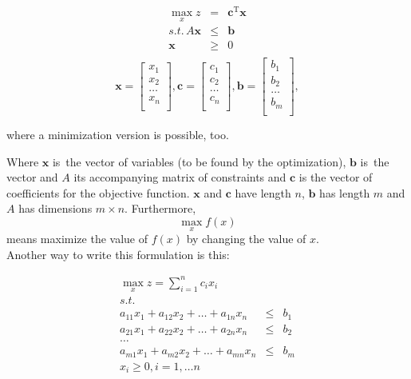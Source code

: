 \begin{eqnarray*}
\max_{x} z & = & \mathbf{c}^{\mathrm{T}}\mathbf{x} \\
s.t.\, A\mathbf{x} & \leqslant & \mathbf{b} \\
\mathbf{x} & \geqslant & 0 \\
\end{eqnarray*}
\[
\mathbf{x} =
\begin{bmatrix}
x_1 \\
x_2 \\
\ldots \\
x_n \\
\end{bmatrix},
\mathbf{c} = 
\begin{bmatrix}
c_1 \\
c_2 \\
\ldots \\
c_n \\
\end{bmatrix},
\mathbf{b} =
\begin{bmatrix}
b_1 \\
b_2 \\
\ldots \\
b_m \\
\end{bmatrix},
\]

where a minimization version is possible, too.

Where $\mathbf{x}$ is~the vector of variables (to be found by the optimization), $\mathbf{b}$ is~the vector and $A$ its accompanying matrix of constraints and $\mathbf{c}$ is the vector of coefficients for the objective function. $\mathbf{x}$ and $\mathbf{c}$ have length $n$, $\mathbf{b}$ has length $m$ and $A$ has dimensions $m \times n$. Furthermore, \[\max_{x} f(x)\] means maximize the value of $f(x)$ by changing the value of $x$.\\

Another way to write this formulation is this:

\begin{eqnarray*}
\max_{x} z = \sum_{i=1}^{n} c_i x_i \\
s.t. & \\
	   a_{11}x_{1} + a_{12}x_{2} + \ldots + a_{1n}x_{n} & \leqslant & b_{1} \\
	   a_{21}x_{1} + a_{22}x_{2} + \ldots + a_{2n}x_{n} & \leqslant & b_{2} \\
	   \ldots \\
	   a_{m1}x_{1} + a_{m2}x_{2} + \ldots + a_{mn}x_{n} & \leqslant & b_{m} \\
	   x_i \geqslant 0, i = 1, \ldots n \\
\end{eqnarray*}

